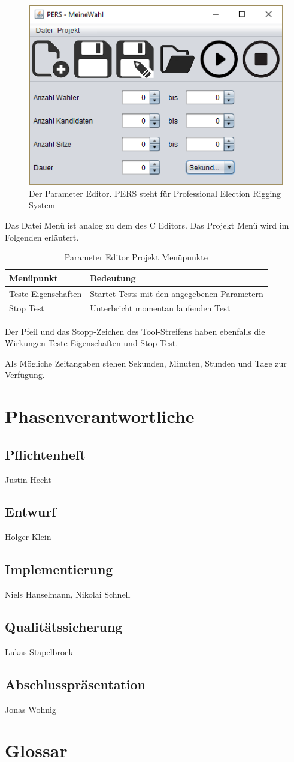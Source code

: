 \documentclass[a4paper]{scrreprt}
\begin{document}
\begin{figure}[H]
\includegraphics[scale=1]{Parameter-editor.png}
\caption{Der Parameter Editor. PERS steht für Professional Election Rigging System}
\label{Parameter-editor}
\end{figure}

Das Datei Menü ist analog zu dem des C Editors. Das Projekt Menü wird im Folgenden erläutert. 

\begin{table}[H]
\begin{tabular}{|p{5cm}|p{10cm}|}
Menüpunkt & Bedeutung \\
\hline
Teste Eigenschaften & Startet Tests mit den angegebenen Parametern \\
Stop Test & Unterbricht momentan laufenden Test
\end{tabular}
\label{Parameter-Projekt-Menü}
\caption{Parameter Editor Projekt Menüpunkte}
\end{table}

Der Pfeil und das Stopp-Zeichen des Tool-Streifens haben ebenfalls die Wirkungen Teste Eigenschaften und Stop Test. 

Als Mögliche Zeitangaben stehen Sekunden, Minuten, Stunden und Tage zur Verfügung.

\chapter{Phasenverantwortliche}
\section{Pflichtenheft} Justin Hecht
\section{Entwurf} Holger Klein 
\section{Implementierung} Niels Hanselmann, Nikolai Schnell
\section{Qualitätssicherung} Lukas Stapelbroek
\section{Abschlusspräsentation} Jonas Wohnig

\chapter{Glossar}
 

\printglossaries
 

 
\end{document}

